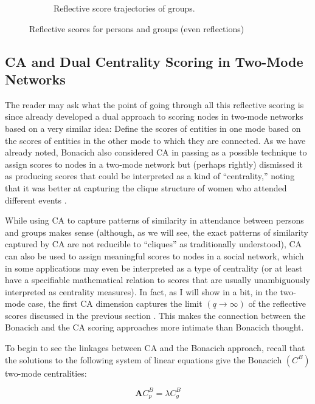 \documentclass[a4paper,fleqn]{cas-sc}
\begin{document}
\begin{figure}[ht!]
\begin{subfigure}[b]{0.45\textwidth}
            \caption{Reflective score trajectories of groups.}
            \label{fig:g-refs}
    \end{subfigure}
    \caption{Reflective scores for persons and groups (even reflections)}
    \label{fig:refs}
\end{figure}

\subsection{CA and Dual Centrality Scoring in Two-Mode Networks} \label{sec:ca}
The reader may ask what the point of going through all this reflective scoring is since \citet{bonacich1991simultaneous} already developed a dual approach to scoring nodes in two-mode networks based on a very similar idea: Define the scores of entities in one mode based on the scores of entities in the other mode to which they are connected. As we have already noted, Bonacich also considered CA in passing as a possible technique to assign scores to nodes in a two-mode network but (perhaps rightly) dismissed it as producing scores that could be interpreted as a kind of ``centrality,'' noting that it was better at capturing the clique structure of women who attended different events \citeyearpar[164]{bonacich1991simultaneous}. 

While using CA to capture patterns of similarity in attendance between persons and groups makes sense (although, as we will see, the exact patterns of similarity captured by CA are not reducible to ``cliques'' as traditionally understood), CA can also be used to assign meaningful scores to nodes in a social network, which in some applications may even be interpreted as a type of centrality (or at least have a specifiable mathematical relation to scores that are usually unambiguously interpreted as centrality measures). In fact, as I will show in a bit, in the two-mode case, the first CA dimension captures the limit $(q \rightarrow \infty)$ of the reflective scores discussed in the previous section \citep{mealy2019interpreting}. This makes the connection between the Bonacich and the CA scoring approaches more intimate than Bonacich thought. 

To begin to see the linkages between CA and the Bonacich approach, recall that the solutions to the following system of linear equations give the Bonacich $(C^B)$ two-mode centralities:

\begin{equation}
    \mathbf{A}C^B_p = \lambda C^B_g 
    \label{eq:bon1}
\end{equation}
\end{document}
